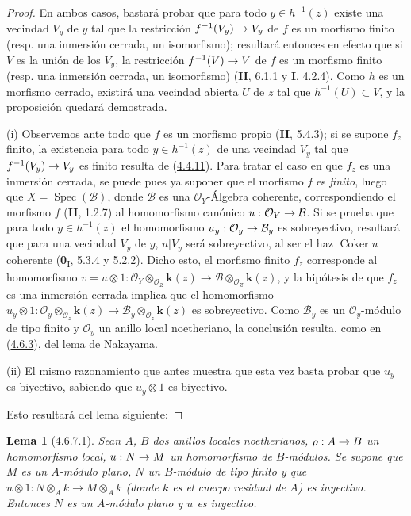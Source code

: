 \documentclass[10pt,oneside,openany]{book}
\theoremstyle{egaenv}\newtheorem*{env}{---}
\theoremstyle{egastatement}
\newtheorem*{lemma}{Lema}
\theoremstyle{egadescription}
\newcommand{\oldpage}[2][]{\marginnote{\normalfont\scriptsize\textbf{#1}\,|\,#2}\ignorespaces}
\renewcommand{\to}{\mathchoice{\longrightarrow}{\rightarrow}{\rightarrow}{\rightarrow}}
\begin{document}
\begin{proof}
En ambos casos, bastará probar que para todo $y\in h^{-1}(z)$
existe una vecindad $V_y$ de $y$ tal que la restricción
$f^{-1}(V_y)\to V_y$ de $f$ es un morfismo finito (resp. una inmersión
cerrada, un isomorfismo); resultará entonces en efecto que si $V$ es la
unión de los $V_y$, la restricción $f^{-1}(V)\to V$ de $f$ es un morfismo
finito (resp. una inmersión cerrada, un isomorfismo) (\textbf{II}, 6.1.1 y \textbf{I}, 4.2.4).
Como $h$ es un morfismo cerrado, existirá una vecindad abierta $U$ de $z$
tal que $h^{-1}(U)\subset V$, y la proposición quedará demostrada.

\noindent (i) Observemos ante todo que $f$ es un morfismo propio
(\textbf{II}, 5.4.3); si se
\oldpage[III]{143}
supone $f_z$ finito, la existencia para todo
$y\in h^{-1}(z)$ de una vecindad $V_y$ tal que $f^{-1}(V_y)\to V_y$ es finito
resulta de (\hyperref[III.4.4.11-fr]{4.4.11}).
Para tratar el caso en que $f_z$ es una inmersión cerrada, se puede pues ya
suponer que el morfismo $f$ es \emph{finito}, luego que
$X=\operatorname{Spec}(\mathcal B)$, donde $\mathcal B$ es una
$\mathcal O_Y$-Álgebra coherente, correspondiendo el morfismo $f$ (\textbf{II}, 1.2.7)
al homomorfismo canónico $u:\mathcal O_Y\to\mathcal B$. Si se prueba
que para todo $y\in h^{-1}(z)$ el homomorfismo
$u_y:\mathcal O_y\to\mathcal B_y$ es sobreyectivo, resultará que para una
vecindad $V_y$ de $y$, $u|V_y$ será sobreyectivo, al ser el haz
$\operatorname{Coker}u$ coherente (\textbf{0}\textsubscript{I}, 5.3.4 y 5.2.2).
Dicho esto, el morfismo finito $f_z$ corresponde al homomorfismo
$v=u\otimes1:
\mathcal O_Y\otimes_{\mathcal O_Z}\boldsymbol{k}(z)
\longrightarrow
\mathcal B\otimes_{\mathcal O_Z}\boldsymbol{k}(z)$,
y la hipótesis de que $f_z$ es una inmersión cerrada implica que
el homomorfismo
$u_y\otimes1:
\mathcal O_y\otimes_{\mathcal O_z}\boldsymbol{k}(z)
\longrightarrow
\mathcal B_y\otimes_{\mathcal O_z}\boldsymbol{k}(z)$
es sobreyectivo. Como $\mathcal B_y$ es un $\mathcal O_y$-módulo de tipo
finito y $\mathcal O_y$ un anillo local noetheriano, la conclusión resulta,
como en (\hyperref[III.4.6.3-fr]{4.6.3}), del lema de Nakayama.

\noindent (ii) El mismo razonamiento que antes muestra que
esta vez basta probar que $u_y$ es biyectivo, sabiendo que
$u_y\otimes1$ es biyectivo.

Esto resultará del lema siguiente:
\end{proof}

\begin{lemma}[4.6.7.1]
\label{III.4.6.7.1-fr}
Sean $A$, $B$ dos anillos locales noetherianos,
$\rho:A\to B$ un homomorfismo local, $u:N\to M$ un homomorfismo de
$B$-módulos. Se supone que $M$ es un $A$-módulo plano, $N$ un $B$-módulo
de tipo finito y que
$u\otimes1:N\otimes_Ak\longrightarrow M\otimes_Ak$
(donde $k$ es el cuerpo residual de $A$) es inyectivo. Entonces $N$ es un
$A$-módulo plano y $u$ es inyectivo.
\end{lemma}
\end{document}
